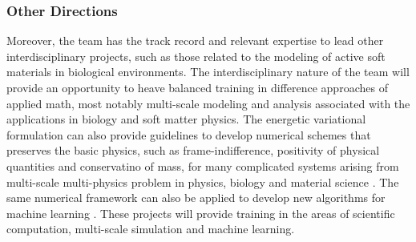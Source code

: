\documentclass[11pt]{NSFamsart}
\newcommand{\dd}{\mathrm{d}}
\begin{document}
\subsubsection*{Other Directions}
Moreover, the team has the track record and relevant expertise to lead other interdisciplinary projects, such as those related to the modeling of active soft materials in biological environments.  The interdisciplinary nature of the team will provide an opportunity to heave balanced training in difference approaches of applied math, most notably multi-scale modeling and analysis associated with the applications in biology and soft matter physics.  The energetic variational formulation can also provide guidelines to develop numerical schemes that preserves the basic physics, such as frame-indifference, positivity of physical quantities and conservatino of mass, for many complicated systems arising from multi-scale multi-physics problem in physics, biology and material science \cite{liu2020variational, liu2020lagrangian, liu2020structure}.  The same numerical framework can also be applied to develop new algorithms for machine learning \cite{wang2020particle}.  These projects will provide training in the areas of scientific computation, multi-scale simulation and machine learning.
\end{document}
